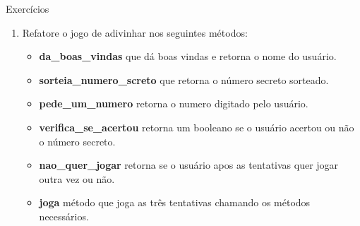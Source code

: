 \begin{frame}{Exercícios}
  \begin{enumerate}
    \item Refatore o jogo de adivinhar nos seguintes métodos:
    \begin{itemize}
      \item {\bf da\_boas\_vindas} que dá boas vindas e retorna o nome do usuário.
      \item {\bf sorteia\_numero\_screto} que retorna o número secreto sorteado.
      \item {\bf pede\_um\_numero} retorna o numero digitado pelo usuário.
      \item {\bf verifica\_se\_acertou } retorna um booleano se o usuário acertou ou não o número secreto.
      \item {\bf nao\_quer\_jogar} retorna se o usuário apos as tentativas quer jogar outra vez ou não.
      \item {\bf joga } método que joga as três tentativas chamando os métodos necessários.
    \end{itemize}
  \end{enumerate}
%  
\end{frame}




